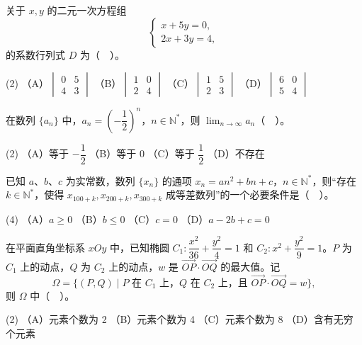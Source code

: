 \begin{question}
关于 $x,y$ 的二元一次方程组
\nopagebreak[4]
\[
\begin{cases}
x+5y=0,\\
2x+3y=4,
\end{cases}
\]
的系数行列式 $D$ 为（　）。

\begin{gkopts}(2)
\task （A）$\begin{vmatrix}0&5\\4&3\end{vmatrix}$
\task （B）$\begin{vmatrix}1&0\\2&4\end{vmatrix}$
\task （C）$\begin{vmatrix}1&5\\2&3\end{vmatrix}$
\task （D）$\begin{vmatrix}6&0\\5&4\end{vmatrix}$
\end{gkopts}

\end{question}
\begin{question}
在数列 $\{a_n\}$ 中，$a_n=\left(-\dfrac12\right)^n$，$n\in\mathbb N^*$，则 $\displaystyle\lim_{n\to\infty}a_n$（　）。

\begin{gkopts}(2)
\task （A）等于 $-\dfrac12$
\task （B）等于 $0$
\task （C）等于 $\dfrac12$
\task （D）不存在
\end{gkopts}

\end{question}
\begin{question}
已知 $a\text{、}b\text{、}c$ 为实常数，数列 $\{x_n\}$ 的通项 $x_n=an^2+bn+c$，$n\in\mathbb N^*$，则“存在 $k\in\mathbb N^*$，使得 $x_{100+k},x_{200+k},x_{300+k}$ 成等差数列”的一个必要条件是（　）。

\begin{gkopts}(4)
\task （A）$a\geqslant0$
\task （B）$b\leqslant0$
\task （C）$c=0$
\task （D）$a-2b+c=0$
\end{gkopts}

\end{question}
\begin{question}
在平面直角坐标系 $xOy$ 中，已知椭圆 $C_1:\dfrac{x^2}{36}+\dfrac{y^2}{4}=1$ 和 $C_2:x^2+\dfrac{y^2}{9}=1$。$P$ 为 $C_1$ 上的动点，$Q$ 为 $C_2$ 上的动点，$w$ 是 $\overrightarrow{OP}\cdot\overrightarrow{OQ}$ 的最大值。记
\nopagebreak[4]
\[
\Omega=\{(P,Q)\mid P\text{ 在 }C_1\text{ 上，}Q\text{ 在 }C_2\text{ 上，且 }\overrightarrow{OP}\cdot\overrightarrow{OQ}=w\},
\]
则 $\Omega$ 中（　）。

\begin{gkopts}(2)
\task （A）元素个数为 2
\task （B）元素个数为 4
\task （C）元素个数为 8
\task （D）含有无穷个元素
\end{gkopts}

\end{question}

